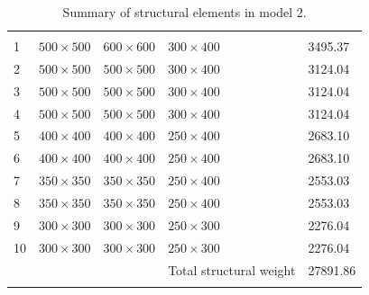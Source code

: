 \documentclass{cup-pan}
\begin{document}
\renewcommand{\arraystretch}{1}
\begin{longtable}{P{0.5in} P{1in} P{1in} P{1in} P{1in}}
\caption{Summary of structural elements in model 2.}\\
\headrow {} &  &  &  &  \\
1 & $500 \times 500$ & $600 \times 600$ & $300 \times 400$ & \num{3495.37} \\
2 & $500 \times 500$ & $500 \times 500$ & $300 \times 400$ & \num{3124.04} \\
3 & $500 \times 500$ & $500 \times 500$ & $300 \times 400$ & \num{3124.04} \\
4 & $500 \times 500$ & $500 \times 500$ & $300 \times 400$ & \num{3124.04} \\
5 & $400 \times 400$ & $400 \times 400$ & $250 \times 400$ & \num{2683.10} \\
6 & $400 \times 400$ & $400 \times 400$ & $250 \times 400$ & \num{2683.10} \\
7 & $350 \times 350$ & $350 \times 350$ & $250 \times 400$ & \num{2553.03} \\
8 & $350 \times 350$ & $350 \times 350$ & $250 \times 400$ & \num{2553.03} \\
9 & $300 \times 300$ & $300 \times 300$ & $250 \times 300$ & \num{2276.04} \\
10 & $300 \times 300$ & $300 \times 300$ & $250 \times 300$ & \num{2276.04} \\
 &  & & Total structural weight & \num{27891.86} \\
\label{tab:cross section model 2}
\end{longtable}
\end{document}
